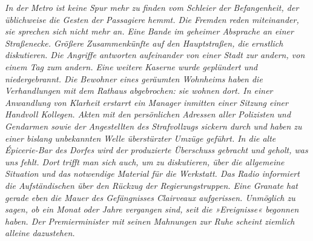 \textit{In der Metro ist keine Spur mehr zu finden vom Schleier der 
Befangenheit, der üblichweise die Gesten der Passagiere hemmt. Die 
Fremden reden miteinander, sie sprechen sich nicht mehr an. Eine 
Bande im geheimer Absprache an einer Straßenecke. Größere 
Zusammenkünfte auf den Hauptstraßen, die ernstlich diskutieren. 
Die Angriffe antworten aufeinander von einer Stadt zur andern, von 
einem Tag zum andern. Eine weitere Kaserne wurde geplündert und 
niedergebrannt. Die Bewohner eines geräumten Wohnheims haben die 
Verhandlungen mit dem Rathaus abgebrochen: sie wohnen dort. In einer 
Anwandlung von Klarheit erstarrt ein Manager inmitten einer Sitzung 
einer Handvoll Kollegen. Akten mit den persönlichen Adressen aller 
Polizisten und Gendarmen sowie der Angestellten des Strafvollzugs 
sickern durch und haben zu einer bislang unbekannten Welle 
überstürzter Umzüge geführt. In die alte Épicerie-Bar des Dorfes wird 
der produzierte Überschuss gebracht und geholt, was uns fehlt. Dort 
trifft man sich auch, um zu diskutieren, über die allgemeine Situation 
und das notwendige Material für die Werkstatt. Das Radio informiert 
die Aufständischen über den Rückzug der Regierungstruppen. Eine 
Granate hat gerade eben die Mauer des Gefängnisses Clairveaux 
aufgerissen. Unmöglich zu sagen, ob ein Monat oder Jahre vergangen 
sind, seit die »Ereignisse« begonnen haben. Der Premierminister mit 
seinen Mahnungen zur Ruhe scheint ziemlich alleine dazustehen.}


